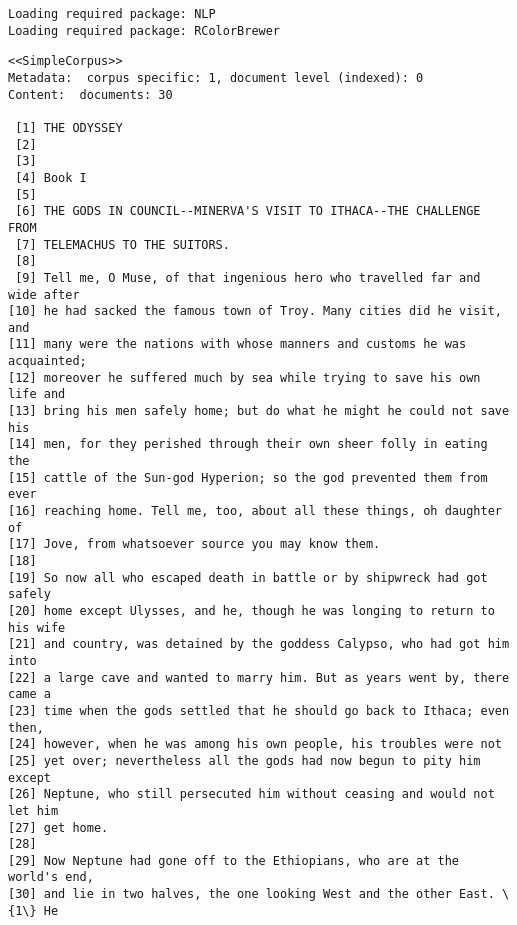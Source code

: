 \documentclass[11pt]{article}
\begin{document}
    \begin{Verbatim}[commandchars=\\\{\}]
Loading required package: NLP
Loading required package: RColorBrewer

    \end{Verbatim}

    \begin{Verbatim}[commandchars=\\\{\}]
<<SimpleCorpus>>
Metadata:  corpus specific: 1, document level (indexed): 0
Content:  documents: 30

 [1] THE ODYSSEY                                                             
 [2]                                                                         
 [3]                                                                         
 [4] Book I                                                                  
 [5]                                                                         
 [6] THE GODS IN COUNCIL--MINERVA'S VISIT TO ITHACA--THE CHALLENGE FROM      
 [7] TELEMACHUS TO THE SUITORS.                                              
 [8]                                                                         
 [9] Tell me, O Muse, of that ingenious hero who travelled far and wide after
[10] he had sacked the famous town of Troy. Many cities did he visit, and    
[11] many were the nations with whose manners and customs he was acquainted; 
[12] moreover he suffered much by sea while trying to save his own life and  
[13] bring his men safely home; but do what he might he could not save his   
[14] men, for they perished through their own sheer folly in eating the      
[15] cattle of the Sun-god Hyperion; so the god prevented them from ever     
[16] reaching home. Tell me, too, about all these things, oh daughter of     
[17] Jove, from whatsoever source you may know them.                         
[18]                                                                         
[19] So now all who escaped death in battle or by shipwreck had got safely   
[20] home except Ulysses, and he, though he was longing to return to his wife
[21] and country, was detained by the goddess Calypso, who had got him into  
[22] a large cave and wanted to marry him. But as years went by, there came a
[23] time when the gods settled that he should go back to Ithaca; even then, 
[24] however, when he was among his own people, his troubles were not        
[25] yet over; nevertheless all the gods had now begun to pity him except    
[26] Neptune, who still persecuted him without ceasing and would not let him 
[27] get home.                                                               
[28]                                                                         
[29] Now Neptune had gone off to the Ethiopians, who are at the world's end, 
[30] and lie in two halves, the one looking West and the other East. \{1\} He  

    \end{Verbatim}
\end{document}
